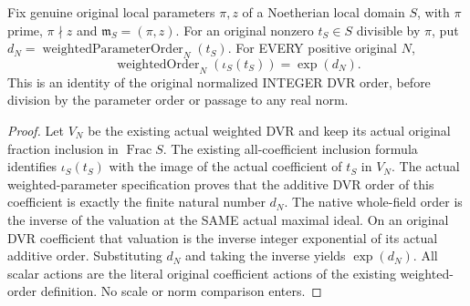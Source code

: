 \begin{lemma}
\label{lem:gauss-common-leading-raw-parameter-order}
\leanok
Fix genuine original local parameters $\pi,z$ of a Noetherian local
domain $S$, with $\pi$ prime, $\pi\nmid z$ and
$\mathfrak m_S=(\pi,z)$. For an original nonzero $t_S\in S$ divisible
by $\pi$, put
$d_N=\operatorname{weightedParameterOrder}_N(t_S)$.
For EVERY positive original $N$,
\[
 \operatorname{weightedOrder}_N(\iota_S(t_S))=\exp(d_N).
\]
This is an identity of the original normalized INTEGER DVR order,
before division by the parameter order or passage to any real norm.
\end{lemma}
\begin{proof}
Let $V_N$ be the existing actual weighted DVR and keep its actual original
fraction inclusion in $\operatorname{Frac}S$. The existing all-coefficient
inclusion formula identifies $\iota_S(t_S)$ with the image of the actual
coefficient of $t_S$ in $V_N$.
The actual weighted-parameter specification proves that the additive
DVR order of this coefficient is exactly the finite natural number
$d_N$. The native whole-field order is the inverse of the valuation at
the SAME actual maximal ideal. On an original DVR coefficient that
valuation is the inverse integer exponential of its actual additive
order. Substituting $d_N$ and taking the inverse yields $\exp(d_N)$.
All scalar actions are the literal original coefficient actions of the
existing weighted-order definition. No scale or norm comparison enters.
\end{proof}

